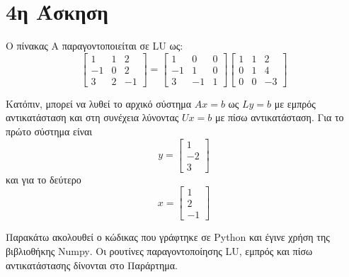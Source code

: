 \documentclass[assignment2.tex]{subfiles}
\begin{document}
\section*{4η Άσκηση}
Ο πίνακας A παραγοντοποιείται σε \textlatin{LU} ως:
\begin{equation}
\left[
\begin{matrix}
1 & 1 & 2 \\
-1& 0 & 2 \\
3 & 2 & -1
\end{matrix}
\right]
=
\left[
\begin{matrix}
1 & 0 & 0 \\
-1& 1 & 0 \\
3 & -1 & 1
\end{matrix}
\right]
\left[
\begin{matrix}
1 & 1 & 2 \\
0 & 1 & 4 \\
0 & 0 & -3
\end{matrix}
\right]
\end{equation}

Κατόπιν, μπορεί να λυθεί το αρχικό σύστημα $Ax=b$ ως $Ly=b$ με εμπρός αντικατάσταση και στη συνέχεια λύνοντας $Ux=b$ με πίσω αντικατάσταση. Για το πρώτο σύστημα είναι
\begin{equation}
y = \left[
\begin{matrix}
1 \\ -2 \\ 3
\end{matrix}
\right]
\end{equation}
και για το δεύτερο
\begin{equation}
x = \left[
\begin{matrix}
1 \\ 2 \\ -1
\end{matrix}
\right]
\end{equation}

Παρακάτω ακολουθεί ο κώδικας που γράφτηκε σε \textlatin{Python} και έγινε χρήση της βιβλιοθήκης \textlatin{Numpy}. Οι ρουτίνες παραγοντοποίησης \textlatin{LU}, εμπρός και πίσω αντικατάστασης δίνονται στο Παράρτημα.

\end{document}
